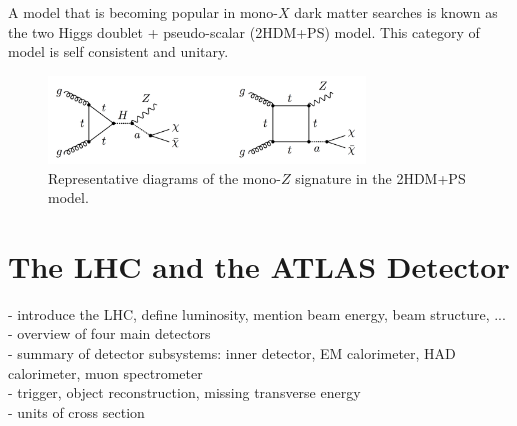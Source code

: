 A model that is becoming popular in mono-$X$ dark matter searches is known as the two Higgs doublet + pseudo-scalar (2HDM+PS) model. This category of model is self consistent and unitary.

\begin{figure}[htb]
\centering
\includegraphics[width=0.75\textwidth]{Figures/2hdma.png}
\caption{Representative diagrams of the mono-$Z$ signature in the 2HDM+PS model.}
\label{fig:2hdma}
\end{figure}



\section{The LHC and the ATLAS Detector}

- introduce the LHC, define luminosity, mention beam energy, beam structure, ...\\
- overview of four main detectors\\
- summary of detector subsystems: inner detector, EM calorimeter, HAD calorimeter, muon spectrometer\\
- trigger, object reconstruction, missing transverse energy\\
- units of cross section\\